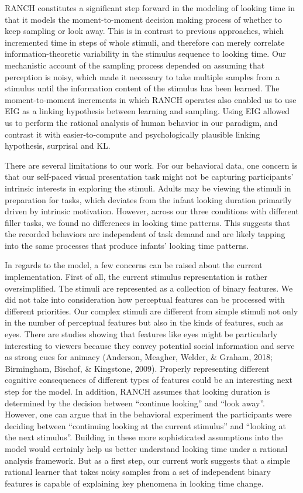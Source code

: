 \documentclass[10pt, letterpaper]{article}
\begin{document}
RANCH constitutes a significant step forward in the modeling of looking
time in that it models the moment-to-moment decision making process of
whether to keep sampling or look away. This is in contrast to previous
approaches, which incremented time in steps of whole stimuli, and
therefore can merely correlate information-theoretic variability in the
stimulus sequence to looking time. Our mechanistic account of the
sampling process depended on assuming that perception is noisy, which
made it necessary to take multiple samples from a stimulus until the
information content of the stimulus has been learned. The
moment-to-moment increments in which RANCH operates also enabled us to
use EIG as a linking hypothesis between learning and sampling. Using EIG
allowed us to perform the rational analysis of human behavior in our
paradigm, and contrast it with easier-to-compute and psychologically
plausible linking hypothesis, surprisal and KL.

There are several limitations to our work. For our behavioral data, one
concern is that our self-paced visual presentation task might not be
capturing participants' intrinsic interests in exploring the stimuli.
Adults may be viewing the stimuli in preparation for tasks, which
deviates from the infant looking duration primarily driven by intrinsic
motivation. However, across our three conditions with different filler
tasks, we found no differences in looking time patterns. This suggests
that the recorded behaviors are independent of task demand and are
likely tapping into the same processes that produce infants' looking
time patterns.

In regards to the model, a few concerns can be raised about the current
implementation. First of all, the current stimulus representation is
rather oversimplified. The stimuli are represented as a collection of
binary features. We did not take into consideration how perceptual
features can be processed with different priorities. Our complex stimuli
are different from simple stimuli not only in the number of perceptual
features but also in the kinds of features, such as eyes. There are
studies showing that features like eyes might be particularly
interesting to viewers because they convey potential social information
and serve as strong cues for animacy (Anderson, Meagher, Welder, \&
Graham, 2018; Birmingham, Bischof, \& Kingstone, 2009). Properly
representing different cognitive consequences of different types of
features could be an interesting next step for the model. In addition,
RANCH assumes that looking duration is determined by the decision
between ``continue looking'' and ``look away''. However, one can argue
that in the behavioral experiment the participants were deciding between
``continuing looking at the current stimulus'' and ``looking at the next
stimulus''. Building in these more sophisticated assumptions into the
model would certainly help us better understand looking time under a
rational analysis framework. But as a first step, our current work
suggests that a simple rational learner that takes noisy samples from a
set of independent binary features is capable of explaining key
phenomena in looking time change.
\end{document}
